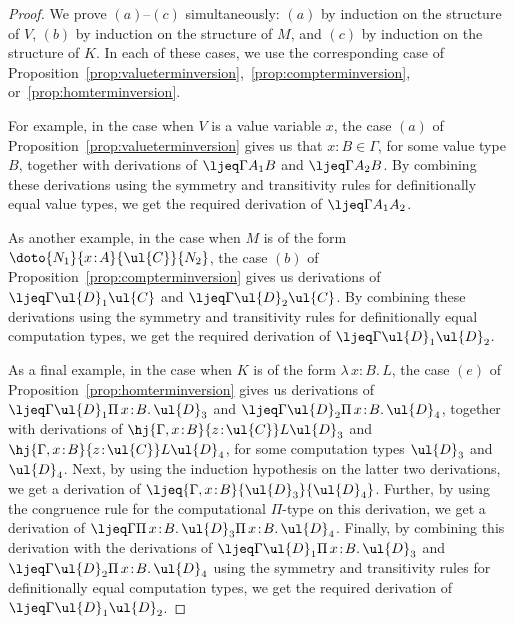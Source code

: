 \begin{proof}
We prove $(a)$--$(c)$ simultaneously: $(a)$ by induction on the structure of $V$, $(b)$ by induction on the structure of $M$, and $(c)$ by induction on the structure of $K$. In each of these cases, we use the corresponding case of Proposition~\ref{prop:valueterminversion},~\ref{prop:compterminversion}, or~\ref{prop:homterminversion}.

For example, in the case when $V$ is a value variable $x$, the case $(a)$ of Proposition~\ref{prop:valueterminversion} gives us that $x \!:\! B \in \Gamma$, for some value type $B$, together with derivations of $\ljeq \Gamma {A_1} B$ and $\ljeq \Gamma {A_2} B$. By combining these derivations using the symmetry and transitivity rules for definitionally equal value types, we get the required derivation of $\ljeq \Gamma {A_1} {A_2}$.

As another example, in the case when $M$ is of the form $\doto {N_1} {x \!:\! A} {\ul{C}} {N_2}$, the case $(b)$ of Proposition~\ref{prop:compterminversion} gives us derivations of $\ljeq \Gamma {\ul{D}_1} {\ul{C}}$ and $\ljeq \Gamma {\ul{D}_2} {\ul{C}}$. By combining these derivations using the symmetry and transitivity rules for definitionally equal computation types, we get the required derivation of $\ljeq \Gamma {\ul{D}_1} {\ul{D}_2}$.

As a final example, in the case when $K$ is of the form $\lambda\, x \!:\! B .\, L$, the case $(e)$ of Proposition~\ref{prop:homterminversion} gives us derivations of $\ljeq \Gamma {\ul{D}_1} {\Pi\, x \!:\! B .\, \ul{D}_3}$ and $\ljeq \Gamma {\ul{D}_2} {\Pi\, x \!:\! B .\, \ul{D}_4}$, \linebreak together with derivations of $\hj {\Gamma, x \!:\! B} {z \!:\! \ul{C}} L {\ul{D}_3}$ and $\hj {\Gamma, x \!:\! B} {z \!:\! \ul{C}} L {\ul{D}_4}$, for some computation types $\ul{D}_3$ and $\ul{D}_4$. Next, by using the induction hypothesis on the latter two derivations, we get a derivation of $\ljeq {\Gamma, x \!:\! B} {\ul{D}_3} {\ul{D}_4}$. Further, by using the \linebreak congruence rule for the computational $\Pi$-type on this derivation, we get a derivation of \linebreak $\ljeq \Gamma {\Pi\, x \!:\! B .\, \ul{D}_3} {\Pi\, x \!:\! B .\, \ul{D}_4}$. Finally, by combining this derivation with the derivations of $\ljeq \Gamma {\ul{D}_1} {\Pi\, x \!:\! B .\, \ul{D}_3}$ and $\ljeq \Gamma {\ul{D}_2} {\Pi\, x \!:\! B .\, \ul{D}_4}$ using the symmetry and transitivity rules for definitionally equal computation types, we get the required derivation of $\ljeq \Gamma {\ul{D}_1} {\ul{D}_2}$.
\end{proof}


